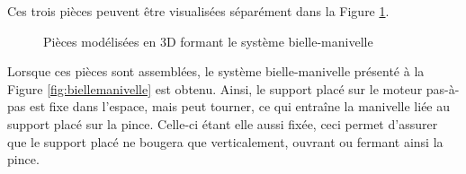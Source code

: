 Ces trois pièces peuvent être visualisées séparément dans la Figure \ref{figure:piècesbiellemanivelle}.

\begin{figure}[H]
    \centering
    \qquad
    \qquad
    
    \caption{Pièces modélisées en 3D formant le système bielle-manivelle}
    \captionsetup{justification=centering}
    \label{figure:piècesbiellemanivelle}
\end{figure}

Lorsque ces pièces sont assemblées, le système bielle-manivelle présenté à la Figure \ref{fig:biellemanivelle} est obtenu. Ainsi, le support placé sur le moteur pas-à-pas est fixe dans l'espace, mais peut tourner, ce qui entraîne la manivelle liée au support placé sur la pince. Celle-ci étant elle aussi fixée, ceci permet d'assurer que le support placé ne bougera que verticalement, ouvrant ou fermant ainsi la pince.


